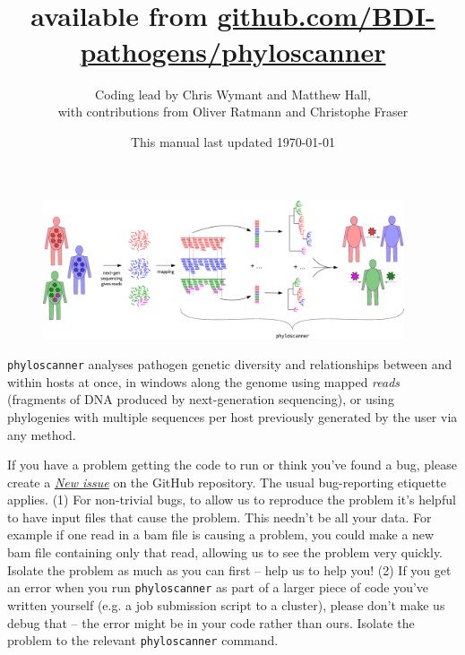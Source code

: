\documentclass{article}
\title{\p\\available from \href{https://github.com/BDI-pathogens/phyloscanner}{github.com/BDI-pathogens/phyloscanner}}
\date{This manual last updated \today}
\author{Coding lead by Chris Wymant and Matthew Hall,\\with contributions from Oliver Ratmann and Christophe Fraser}
\newcommand{\p}{\texttt{phyloscanner}\xspace}
\begin{document}
\maketitle


\begin{figure}[!h]
\centering
\includegraphics[width=0.95\textwidth]{PhyloscannerDiagram_big4.pdf}
\end{figure}

\vspace*{10mm}

\p analyses pathogen genetic diversity and relationships between and within hosts at once, in windows along the genome using mapped {\it reads} (fragments of DNA produced by next-generation sequencing), or using phylogenies with multiple sequences per host previously generated by the user via any method.

\vspace*{10mm}

If you have a problem getting the code to run or think you've found a bug, please create a \href{https://github.com/BDI-pathogens/phyloscanner/issues}{{\it New issue}} on the GitHub repository.
The usual bug-reporting etiquette applies.
(1) For non-trivial bugs, to allow us to reproduce the problem it's helpful to have input files that cause the problem.
This needn't be all your data.
For example if one read in a bam file is causing a problem, you could make a new bam file containing only that read, allowing us to see the problem very quickly.
Isolate the problem as much as you can first -- help us to help you!
(2) If you get an error when you run \p as part of a larger piece of code you've written yourself (e.g. a job submission script to a cluster), please don't make us debug that -- the error might be in your code rather than ours.
Isolate the problem to the relevant \p command.  




\end{document}
